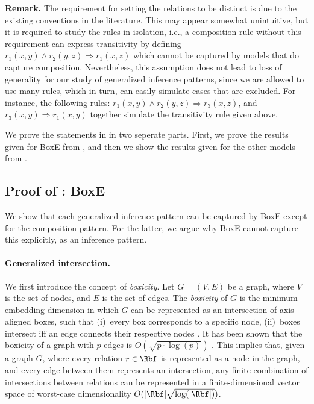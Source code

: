 \documentclass{article}
\begin{document}
\textbf{Remark.} The requirement for setting the relations to be distinct is due to the existing conventions in the literature. This may appear somewhat unintuitive, but it is required to study the rules in isolation, i.e., a composition rule without this requirement can express transitivity by defining ${r_1(x,y) \land r_2(y,z) \Rightarrow r_1(x,z)}$ which cannot be captured by models that do capture composition.
Nevertheless, this assumption does not lead to loss of generality for our study of generalized inference patterns, since we are allowed to use many rules, which in turn, can easily simulate cases that are excluded. For instance, the following rules:
$r_1(x,y) \land r_2(y,z) \Rightarrow r_3(x,z)$, and $r_3(x,y) \Rightarrow r_1(x,y)$ together simulate the transitivity rule given above. 



We prove the statements in  in two seperate parts. First, we prove the results given for BoxE from , and then we show the results given for the other models from .

\subsection{Proof of : BoxE}
\label{app:genInfProof}

We show that each generalized inference pattern can be captured by BoxE except for the composition pattern. For the latter, we argue why BoxE cannot capture this explicitly, as an inference pattern.

\paragraph{Generalized intersection.} We first introduce the concept of \emph{boxicity}. Let $G=(V,E)$ be a graph, where $V$ is the set of nodes, and $E$ is the set of edges. The \emph{boxicity} of $G$ is the minimum embedding dimension in which $G$ can be represented as an intersection of axis-aligned boxes, such that 
(i)~every box corresponds to a specific node, 
(ii)~boxes intersect iff an edge connects their respective nodes \cite{Roberts68}. 
It has been shown that the boxicity of a graph with $p$ edges is $O(\sqrt{p \cdot \log(p)})$ \cite{Chandran08}. This implies that, given a graph $G$, where every relation $r \in \Rbf$ is represented as a node in the graph, and every edge between them represents an intersection,
any finite combination of intersections between relations can be represented in a finite-dimensional vector space of worst-case dimensionality $O(|\Rbf| \sqrt{\log(|\Rbf|)})$. 
\end{document}
